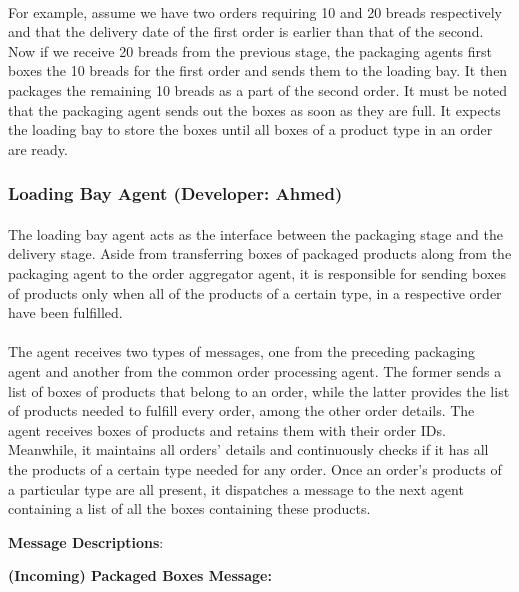 \documentclass[11pt, a4paper]{article}
\begin{document}
\paragraph{}
For example, assume we have two orders requiring 10 and 20 breads respectively and that the delivery date of the first order is earlier than that of the second. Now if we receive 20 breads from the previous stage, the packaging agents first boxes the 10 breads for the first order and sends them to the loading bay. It then packages the remaining 10 breads as a part of the second order. It must be noted that the packaging agent sends out the boxes as soon as they are full. It expects the loading bay to store the boxes until all boxes of a product type in an order are ready.

\subsubsection{Loading Bay Agent (Developer: Ahmed)}
\paragraph{}
The loading bay agent acts as the interface between the packaging stage and the delivery stage. Aside from transferring boxes of packaged products along from the packaging agent to the order aggregator agent, it is responsible for sending boxes of products only when all of the products of a certain type, in a respective order have been fulfilled.
\paragraph{}
The agent receives two types of messages, one from the preceding packaging agent and another from the common order processing agent. The former sends a list of boxes of products that belong to an order, while the latter provides the list of products needed to fulfill every order, among the other order details. The agent receives boxes of products and retains them with their order IDs. Meanwhile, it maintains all orders' details and continuously checks if it has all the products of a certain type needed for any order. Once an order's products of a particular type are all present, it dispatches a message to the next agent containing a list of all the boxes containing these products.
	
\pagebreak
\hfill\break
\textbf{Message Descriptions}:

\hfill\break
\textbf{(Incoming) Packaged Boxes Message:}
\end{document}

